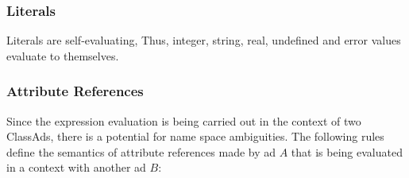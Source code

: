 \subsubsection{Literals}
Literals are self-evaluating, Thus, integer, string, real, undefined and
error values evaluate to themselves.

\subsubsection{Attribute References}
Since the expression evaluation is being carried out in the context of two
ClassAds, there is a potential for name space ambiguities.  The following
rules define the semantics of attribute references made by ad $A$ that is being 
evaluated in a context with another ad $B$:
